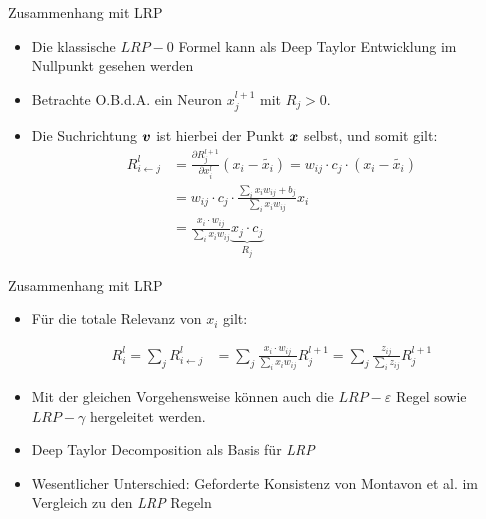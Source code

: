 \begin{frame}{Zusammenhang mit LRP}
\begin{itemize}
\item Die klassische $LRP-0$ Formel kann als Deep Taylor Entwicklung im Nullpunkt gesehen werden
\item Betrachte O.B.d.A. ein Neuron $x_j^{l+1}$ mit $R_j > 0$. 
\item Die Suchrichtung $\boldsymbol{v}$ ist hierbei der Punkt $\boldsymbol{x}$ selbst, und somit gilt:
\begin{align*}
R_{i \leftarrow j}^l &=\frac{\partial R_{j}^{l+1}}{\partial x_{i}^l}
(x_i - \tilde{x_i})  = w_{ij} \cdot c_j \cdot (x_i - \tilde{x_i}) \\
&= w_{ij} \cdot c_j \cdot \frac{\sum_{i} x_{i} w_{i j}+b_{j}}{\sum_{i} x_{i} w_{i j}} x_i\\
&= \frac{x_i \cdot w_{ij}}{\sum_{i} x_{i} w_{i j}} \underbrace{ x_j \cdot c_j}_{ R_j }
\end{align*}
\end{itemize}
\end{frame}

\begin{frame}{Zusammenhang mit LRP}
\begin{itemize}
\item Für die totale Relevanz von $x_i$ gilt:

\begin{align*}
R_i^l = \sum_{j} R_{i \leftarrow j}^l &= \sum_{j} \frac{x_i \cdot w_{ij}}{\sum_{i} x_{i} w_{i j}} R_j^{l+1} = \sum_{j} \frac{z_{ij}}{\sum_{i} z_{i j}} R_j^{l+1}
\end{align*}
\item Mit der gleichen Vorgehensweise können auch die $LRP-\varepsilon$ Regel sowie $LRP-\gamma$ hergeleitet werden.
\item Deep Taylor Decomposition als Basis für \textit{LRP}
\item Wesentlicher Unterschied: Geforderte Konsistenz von Montavon et al. im Vergleich zu den \textit{LRP} Regeln
\end{itemize}
\end{frame}

